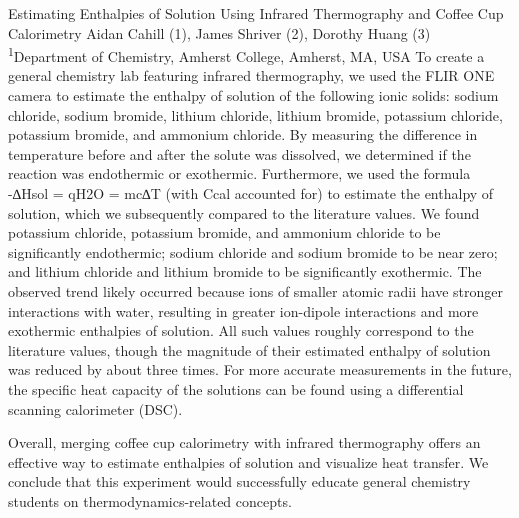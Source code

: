 \makeabstract
{
Estimating Enthalpies of Solution Using Infrared Thermography and Coffee Cup Calorimetry
}
{
Aidan Cahill (1), James Shriver (2), Dorothy Huang (3)
}
{
\textsuperscript{1}Department of Chemistry, Amherst College, Amherst, MA, USA
}
{
To create a general chemistry lab featuring infrared thermography, we used the FLIR ONE camera to estimate the enthalpy of solution of the following ionic solids: sodium chloride, sodium bromide, lithium chloride, lithium bromide, potassium chloride, potassium bromide, and ammonium chloride. 
}
{
By measuring the difference in temperature before and after the solute was dissolved, we determined if the reaction was endothermic or exothermic. Furthermore, we used the formula -∆Hsol = qH2O = mc∆T (with Ccal accounted for) to estimate the enthalpy of solution, which we subsequently compared to the literature values.
}
{
We found potassium chloride, potassium bromide, and ammonium chloride to be significantly endothermic; sodium chloride and sodium bromide to be near zero; and lithium chloride and lithium bromide to be significantly exothermic. The observed trend likely occurred because ions of smaller atomic radii have stronger interactions with water, resulting in greater ion-dipole interactions and more exothermic enthalpies of solution. All such values roughly correspond to the literature values, though the magnitude of their estimated enthalpy of solution was reduced by about three times. For more accurate measurements in the future, the specific heat capacity of the solutions can be found using a differential scanning calorimeter (DSC).
}
{
Overall, merging coffee cup calorimetry with infrared thermography offers an effective way to estimate enthalpies of solution and visualize heat transfer. We conclude that this experiment would successfully educate general chemistry students on thermodynamics-related concepts.  

}

\newpage
